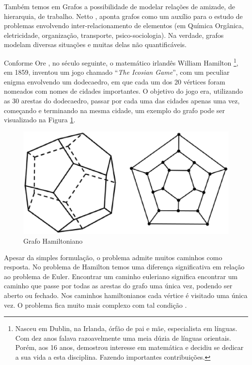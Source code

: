 Também temos em Grafos a possibilidade de modelar relações de amizade, de hierarquia, de trabalho. Netto \cite{Netto:2012}, aponta grafos como um auxílio para o estudo de problemas envolvendo inter-relacionamento de elementos (em Química Orgânica, eletricidade, organização, transporte, psico-sociologia). Na verdade, grafos modelam diversas situações e muitas delas não quantificáveis.

Conforme Ore \cite{Ore:1963}, no século seguinte, o matemático irlandês William Hamilton \footnote{Nasceu em Dublin, na Irlanda, órfão de pai e mãe, especialista em línguas. Com dez anos falava razoavelmente uma meia dúzia de línguas orientais. Porém, aos 16 anos, demostrou interesse em matemática e decidiu se dedicar a sua vida a esta disciplina. Fazendo importantes contribuições.}, em 1859, inventou um jogo chamado ``\textit{The Icosian Game}'', com um peculiar enigma envolvendo um dodecaedro, em que cada um dos 20 vértices foram nomeados com nomes de cidades importantes. O objetivo do jogo era, utilizando as 30 arestas do dodecaedro, passar por cada uma das cidades apenas uma vez, começando e terminando na mesma cidade, um exemplo do grafo pode ser visualizado na Figura \ref{grafo_hamiltoniano}.

\begin{figure}[!h]
	\centering
	\includegraphics[scale=0.5]{figuras/capitulo1/grafo_hamiltoniano.eps}
	\caption{Grafo Hamiltoniano}
	\label{grafo_hamiltoniano}
\end{figure}

Apesar da simples formulação, o problema admite muitos caminhos como resposta. No problema de Hamilton temos uma diferença significativa em relação ao problema de Euler. Encontrar um caminho euleriano significa encontrar um caminho que passe por todas as arestas do grafo uma única vez, podendo ser aberto ou fechado. Nos caminhos hamiltonianos cada vértice é visitado uma única vez. O problema fica muito mais complexo com tal condição \cite{Costa:2011}.

